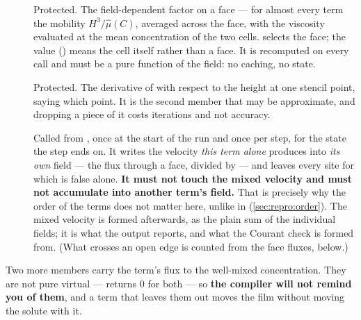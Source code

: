 \begin{description}
  \item[] Protected. The
    field-dependent factor on a face --- for almost every term the mobility
    $H^{3}/\hat\mu(C)$, averaged across the face, with the viscosity evaluated
    at the mean concentration of the two cells.  selects the face;
    the value  () means the cell itself rather
    than a face. It is recomputed on every call and must be a pure function of
    the field: no caching, no state.

  \item[] Protected. The
    derivative of  with respect to the height at one
    stencil point,  saying which point. It is the second member that
    may be approximate, and dropping a piece of it costs iterations and not
    accuracy.

  \item[] Called from
    , once at the start of
    the run and once per step, for the state the step ends on. It writes the velocity
    \emph{this term alone} produces into \emph{its own} field --- the flux
    through a face, divided by  --- and leaves every site
    for which  is false alone. \textbf{It must not
    touch the mixed velocity and must not accumulate into another term's
    field.} That is precisely why the order of the terms does not matter here,
    unlike in  (\cref{sec:repro:order}). The mixed velocity is
    formed afterwards, as the plain sum of the individual fields; it is what
    the output reports, and what the Courant check is formed from. (What
    crosses an open edge is counted from the face fluxes, 
    below.)

\end{description}

Two more members carry the term's flux to the well-mixed concentration. They
are not pure virtual ---  returns 0 for both --- so
\textbf{the compiler will not remind you of them}, and a term that leaves them
out moves the film without moving the solute with it.

